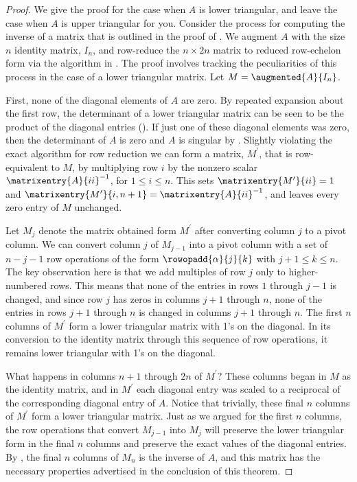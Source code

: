 \begin{proof}
We give the proof for the case when $A$ is lower triangular, and leave the case when $A$ is upper triangular for you.  Consider the process for computing the inverse of a matrix that is outlined in the proof of .  We augment $A$ with the size $n$ identity matrix, $I_n$, and row-reduce the $n\times 2n$ matrix to reduced row-echelon form via the algorithm in .  The proof involves tracking the peculiarities of this process in the case of a lower triangular matrix.  Let $M=\augmented{A}{I_n}$.\par
%
First, none of the diagonal elements of $A$ are zero.  By repeated expansion about the first row, the determinant of a lower triangular matrix can be seen to be the product of the diagonal entries ().  If just one of these diagonal elements was zero, then the determinant of $A$ is zero and $A$ is singular by .   Slightly violating the exact algorithm for row reduction we can form a matrix, $M^\prime$, that is row-equivalent to $M$, by multiplying row $i$ by the nonzero scalar $\matrixentry{A}{ii}^{-1}$, for $1\leq i\leq n$.  This sets $\matrixentry{M^\prime}{ii}=1$ and $\matrixentry{M^\prime}{i,n+1}=\matrixentry{A}{ii}^{-1}$, and leaves every zero entry of $M$ unchanged.\par
%
Let $M_j$ denote the matrix obtained form $M^\prime$ after converting column $j$ to a pivot column.  We can convert column $j$ of $M_{j-1}$ into a pivot column with a set of $n-j-1$ row operations of the form $\rowopadd{\alpha}{j}{k}$ with $j+1\leq k\leq n$.  The key observation here is that we add multiples of row $j$ only to higher-numbered rows.  This means that none of the entries in rows $1$ through $j-1$ is changed, and since row $j$ has zeros in columns $j+1$ through $n$, none of the entries in rows $j+1$ through $n$ is changed in columns $j+1$ through $n$.  The first $n$ columns of $M^\prime$ form a lower triangular matrix with 1's on the diagonal.  In its conversion to the identity matrix through this sequence of row operations, it remains lower triangular with 1's on the diagonal.\par
%
What happens in columns $n+1$ through $2n$ of $M^\prime$?  These columns began in $M$ as the identity matrix, and in $M^\prime$ each diagonal entry was scaled to a reciprocal of the corresponding diagonal entry of $A$.  Notice that trivially, these final $n$ columns of $M^\prime$ form a lower triangular matrix.  Just as we argued for the first $n$ columns, the row operations that convert $M_{j-1}$ into $M_j$ will preserve the lower triangular form in the final $n$ columns and preserve the exact values of the diagonal entries.  By , the final $n$ columns of $M_n$ is the inverse of $A$, and this matrix has the necessary properties advertised in the conclusion of this theorem.
%
\end{proof}
%



